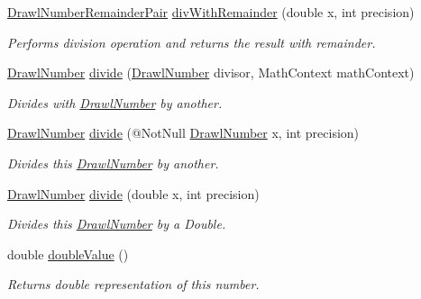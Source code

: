 \begin{DoxyCompactItemize}
\hyperlink{classcom_1_1aarrelaakso_1_1drawl_1_1_drawl_number_remainder_pair}{Drawl\+Number\+Remainder\+Pair} \hyperlink{classcom_1_1aarrelaakso_1_1drawl_1_1_drawl_number_a99090eea8ac1be98cf40ef75f8eed090}{div\+With\+Remainder} (double x, int precision)
\begin{DoxyCompactList}\small\item\em Performs division operation and returns the result with remainder. \end{DoxyCompactList}\item 
\hyperlink{classcom_1_1aarrelaakso_1_1drawl_1_1_drawl_number}{Drawl\+Number} \hyperlink{classcom_1_1aarrelaakso_1_1drawl_1_1_drawl_number_a42d9f576373ff039f2ee03ef9bb9d079}{divide} (\hyperlink{classcom_1_1aarrelaakso_1_1drawl_1_1_drawl_number}{Drawl\+Number} divisor, Math\+Context math\+Context)
\begin{DoxyCompactList}\small\item\em Divides with \hyperlink{classcom_1_1aarrelaakso_1_1drawl_1_1_drawl_number}{Drawl\+Number} by another. \end{DoxyCompactList}\item 
\hyperlink{classcom_1_1aarrelaakso_1_1drawl_1_1_drawl_number}{Drawl\+Number} \hyperlink{classcom_1_1aarrelaakso_1_1drawl_1_1_drawl_number_ae3f1338acaa167edcc345c7be3a48aec}{divide} (@Not\+Null \hyperlink{classcom_1_1aarrelaakso_1_1drawl_1_1_drawl_number}{Drawl\+Number} x, int precision)
\begin{DoxyCompactList}\small\item\em Divides this \hyperlink{classcom_1_1aarrelaakso_1_1drawl_1_1_drawl_number}{Drawl\+Number} by another. \end{DoxyCompactList}\item 
\hyperlink{classcom_1_1aarrelaakso_1_1drawl_1_1_drawl_number}{Drawl\+Number} \hyperlink{classcom_1_1aarrelaakso_1_1drawl_1_1_drawl_number_aaefd2f03c90250ae78a0baaea1c468d4}{divide} (double x, int precision)
\begin{DoxyCompactList}\small\item\em Divides this \hyperlink{classcom_1_1aarrelaakso_1_1drawl_1_1_drawl_number}{Drawl\+Number} by a Double. \end{DoxyCompactList}\item 
double \hyperlink{classcom_1_1aarrelaakso_1_1drawl_1_1_drawl_number_af5e6d77e51e7b6167d18acec2eb26877}{double\+Value} ()
\begin{DoxyCompactList}\small\item\em Returns double representation of this number. \end{DoxyCompactList}\item 

\end{DoxyCompactItemize}
